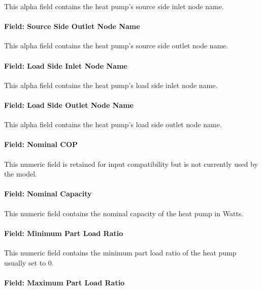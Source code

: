 This alpha field contains the heat pump's source side inlet node name.

\paragraph{Field: Source Side Outlet Node Name}\label{field-source-side-outlet-node-name-3}

This alpha field contains the heat pump's source side outlet node name.

\paragraph{Field: Load Side Inlet Node Name}\label{field-load-side-inlet-node-name-3}

This alpha field contains the heat pump's load side inlet node name.

\paragraph{Field: Load Side Outlet Node Name}\label{field-load-side-outlet-node-name-3}

This alpha field contains the heat pump's load side outlet node name.

\paragraph{Field: Nominal COP}\label{field-nominal-cop-5}

This numeric field is retained for input compatibility but is not currently used by the model.

\paragraph{Field: Nominal Capacity}\label{field-nominal-capacity-9}

This numeric field contains the nominal capacity of the heat pump in Watts.

\paragraph{Field: Minimum Part Load Ratio}\label{field-minimum-part-load-ratio-12}

This numeric field contains the minimum part load ratio of the heat pump usually set to 0.

\paragraph{Field: Maximum Part Load Ratio}\label{field-maximum-part-load-ratio-12}


